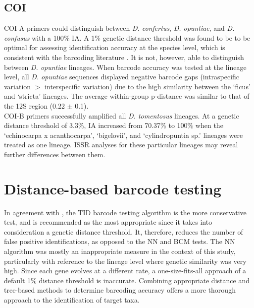 \subsection{COI}
COI-A primers could distinguish between \textit{D. confertus}, \textit{D. opuntiae}, and \textit{D. confusus} with a 100\% IA. A 1\% genetic distance threshold was found to be to be optimal for assessing identification accuracy at the species level, which is consistent with the barcoding literature \citep{Hebert2003, Hebert2003a}. It is not, however, able to distinguish between \textit{D. opuntiae} lineages. When barcode accuracy was tested at the lineage level, all \textit{D. opuntiae} sequences displayed negative barcode gaps (intraspecific variation $>$ interspecific variation) due to the high similarity between the `ficus' and `stricta' lineages. 
The average within-group p-distance was similar to that of the 12S region (0.22 $\pm$ 0.1). \\
COI-B primers successfully amplified all \textit{D. tomentosus} lineages. At a genetic distance threshold of 3.3\%, IA increased from 70.37\% to 100\% when the `echinocarpa x acanthocarpa', `bigelovii', and `cylindropuntia sp.' lineages were treated as one lineage. ISSR analyses for these particular lineages may reveal further differences between them. 

\section{Distance-based barcode testing}

In agreement with \citet{Birch2017TestingAustralia}, the TID barcode testing algorithm is the more conservative test, and is recommended as the most appropriate since it takes into consideration a genetic distance threshold. It, therefore, reduces the number of false positive identifications, as opposed to the NN and BCM tests. The NN algorithm was mostly an inappropriate measure in the context of this study, particularly with reference to the lineage level where genetic similarity was very high. 
Since each gene evolves at a different rate, a one-size-fits-all approach of a default 1\% distance threshold is inaccurate. Combining appropriate distance and tree-based methods to determine barcoding accuracy offers a more thorough approach to the identification of target taxa.


